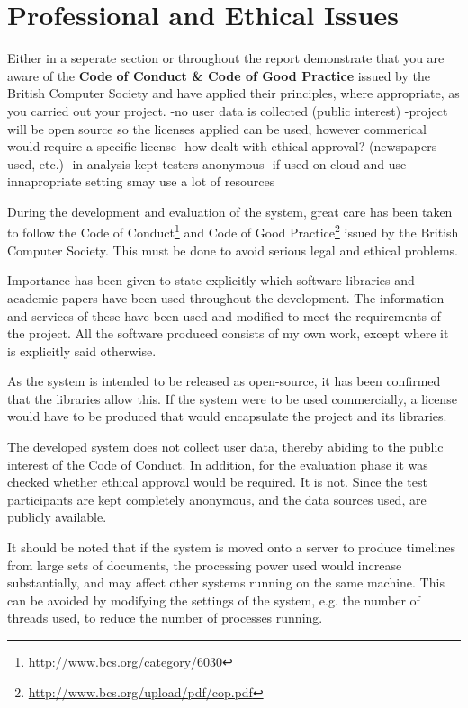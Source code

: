 \chapter{Professional and Ethical Issues}
Either in a seperate section or throughout the report demonstrate that you are aware of the 
\textbf{Code of Conduct \& Code of Good Practice} issued by the British Computer Society and have applied their principles, where appropriate, as you carried out your project.
-no user data is collected (public interest)
-project will be open source so the licenses applied can be used, however commerical would require a specific license
-how dealt with ethical approval? (newspapers used, etc.)
-in analysis kept testers anonymous
-if used on cloud and use innapropriate setting smay use a lot of resources

\par During the development and evaluation of the system, great care has been taken to follow the Code of Conduct\footnote{\url{http://www.bcs.org/category/6030}} and Code of Good Practice\footnote{\url{http://www.bcs.org/upload/pdf/cop.pdf}} issued by the British Computer Society. This must be done to avoid serious legal and ethical problems.

\par Importance has been given to state explicitly which software libraries and academic papers have been used throughout the development. The information and services of these have been used and modified to meet the requirements of the project. All the software produced consists of my own work, except where it is explicitly said otherwise. 

\par As the system is intended to be released as open-source, it has been confirmed that the libraries allow this. If the system were to be used commercially, a license would have to be produced that would encapsulate the project and its libraries.

\par The developed system does not collect user data, thereby abiding to the public interest of the Code of Conduct. In addition, for the evaluation phase it was checked whether ethical approval would be required. It is not. Since the test participants are kept completely anonymous, and the data sources used, are publicly available.

\par It should be noted that if the system is moved onto a server to produce timelines from large sets of documents, the processing power used would increase substantially, and may affect other systems running on the same machine. This can be avoided by modifying the settings of the system, e.g. the number of threads used, to reduce the number of processes running.

